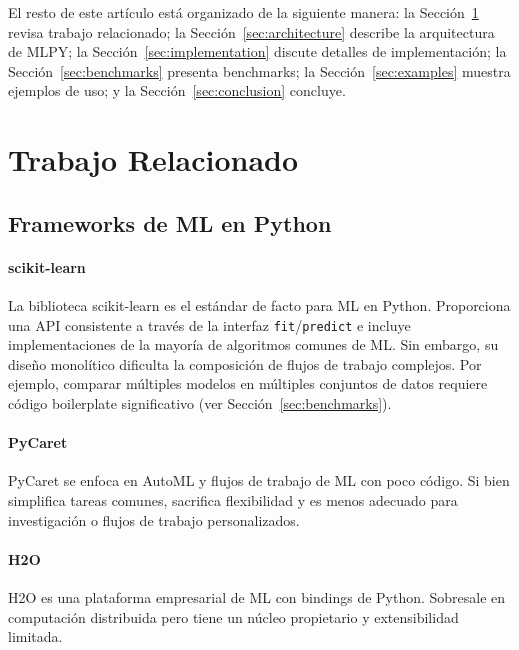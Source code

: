 \documentclass[twoside,11pt]{article}
\begin{document}
El resto de este artículo está organizado de la siguiente manera: la Sección~\ref{sec:related} revisa trabajo relacionado; la Sección~\ref{sec:architecture} describe la arquitectura de MLPY; la Sección~\ref{sec:implementation} discute detalles de implementación; la Sección~\ref{sec:benchmarks} presenta benchmarks; la Sección~\ref{sec:examples} muestra ejemplos de uso; y la Sección~\ref{sec:conclusion} concluye.

\section{Trabajo Relacionado}
\label{sec:related}

\subsection{Frameworks de ML en Python}

\paragraph{scikit-learn}
La biblioteca scikit-learn \citep{pedregosa2011scikit} es el estándar de facto para ML en Python. Proporciona una API consistente a través de la interfaz \texttt{fit}/\texttt{predict} e incluye implementaciones de la mayoría de algoritmos comunes de ML. Sin embargo, su diseño monolítico dificulta la composición de flujos de trabajo complejos. Por ejemplo, comparar múltiples modelos en múltiples conjuntos de datos requiere código boilerplate significativo (ver Sección~\ref{sec:benchmarks}).

\paragraph{PyCaret}
PyCaret \citep{pycaret} se enfoca en AutoML y flujos de trabajo de ML con poco código. Si bien simplifica tareas comunes, sacrifica flexibilidad y es menos adecuado para investigación o flujos de trabajo personalizados.

\paragraph{H2O}
H2O \citep{h2o} es una plataforma empresarial de ML con bindings de Python. Sobresale en computación distribuida pero tiene un núcleo propietario y extensibilidad limitada.
\end{document}
